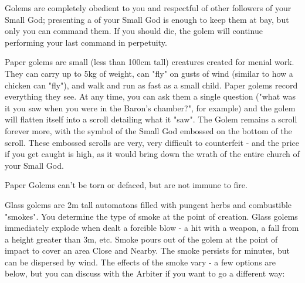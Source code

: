 Golems are completely obedient to you and respectful of other followers of your Small God; presenting a  of your Small God is enough to keep them at bay, but only you can command them. If you should die, the golem will continue performing your last command in perpetuity.



Paper golems are small (less than 100cm tall) creatures created for menial work.  They can carry up to 5kg of weight, can "fly" on gusts of wind (similar to how a chicken can "fly"), and walk and run as fast as a small child.  Paper golems record everything they see.  At any time, you can ask them a single question ("what was it you saw when you were in the Baron's chamber?", for example) and the golem will flatten itself into a scroll detailing what it "saw". The Golem remains a scroll forever more, with the symbol of the Small God embossed on the bottom of the scroll.  These embossed scrolls are very, very difficult to counterfeit - and the price if you get caught is high, as it would bring down the wrath of the entire church of your Small God.

Paper Golems can't be torn or defaced, but are not immune to fire.


Glass golems are 2m tall automatons filled with pungent herbs and combustible "smokes".  You determine the type of smoke at the point of creation. Glass golems immediately explode when dealt a forcible blow - a hit with a weapon, a fall from a height greater than 3m, etc. Smoke pours out of the golem at the point of impact to cover an area Close and Nearby. The smoke persists for minutes, but can be dispersed by wind. The effects of the smoke vary - a few options are below, but you can discuss with the Arbiter if you want to go a different way:


